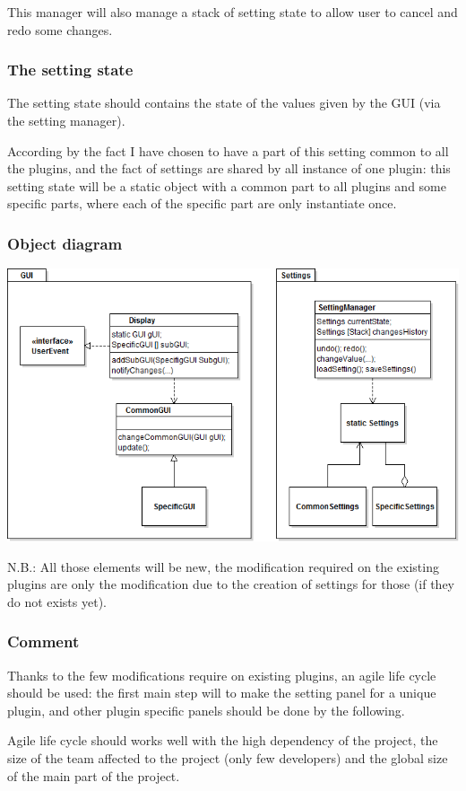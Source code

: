 This manager will also manage a stack of setting state to allow user to cancel and redo some changes.

\subsubsection{The setting state}

The setting state should contains the state of the values given by the GUI (via the setting manager).

According by the fact I have chosen to have a part of this setting common to all the plugins, and the fact of settings are shared by all instance of one plugin: this setting state will be a static object with a common part to all plugins and some specific parts, where each of the specific part are only instantiate once.


\subsubsection{Object diagram}

\begin{changemargin}{-3cm}{-3cm}
\includegraphics[width=\linewidth]{images/diag1.png}
\end{changemargin}

N.B.: All those elements will be new, the modification required on the existing plugins are only the modification due to the creation of settings for those (if they do not exists yet).


\subsubsection{Comment}

Thanks to the few modifications require on existing plugins, an agile life cycle should be used: the first main step will to make the setting panel for a unique plugin, and other plugin specific panels should be done by the following.

Agile life cycle should works well with the high dependency of the project, the size of the team affected to the project (only few developers) and the global size of the main part of the project.






